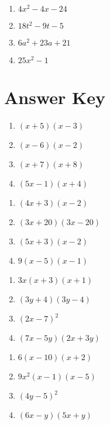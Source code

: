 \begin{multicols}{4}
\begin{enumerate}	\setcounter{enumi}{\value{Review}}
\item $4x^2-4x-24$
\item $18t^2-9t-5$
\item $6a^2 + 23a + 21$
\item $25x^2-1$
\end{enumerate}
\end{multicols}

\newpage

\section{Answer Key}

\begin{multicols}{4}
\begin{enumerate}
\item $(x + 5)(x-3)$
\item $(x-6)(x-2)$
\item $(x+7)(x+8)$
\item $(5x-1)(x+4)$
\end{enumerate}	\setcounter{Review}{\value{enumi}}
\end{multicols}
\begin{multicols}{4}
\begin{enumerate}	\setcounter{enumi}{\value{Review}}
\item $(4x+3)(x-2)$
\item $(3x+20)(3x-20)$
\item $(5x+3)(x-2)$
\item $9(x-5)(x-1)$
\end{enumerate}	\setcounter{Review}{\value{enumi}}
\end{multicols}
\begin{multicols}{4}
\begin{enumerate}	\setcounter{enumi}{\value{Review}}
\item $3x(x+3)(x+1)$
\item $(3y+4)(3y-4)$
\item $(2x-7)^2$
\item $(7x - 5y)(2x + 3y)$
\end{enumerate}	\setcounter{Review}{\value{enumi}}
\end{multicols}
\begin{multicols}{4}
\begin{enumerate}	\setcounter{enumi}{\value{Review}}
\item $6(x-10)(x+2)$
\item $9x^2(x-1)(x-5)$
\item $(4y-5)^2$
\item $(6x-y)(5x+y)$
\end{enumerate}	\setcounter{Review}{\value{enumi}}
\end{multicols}
